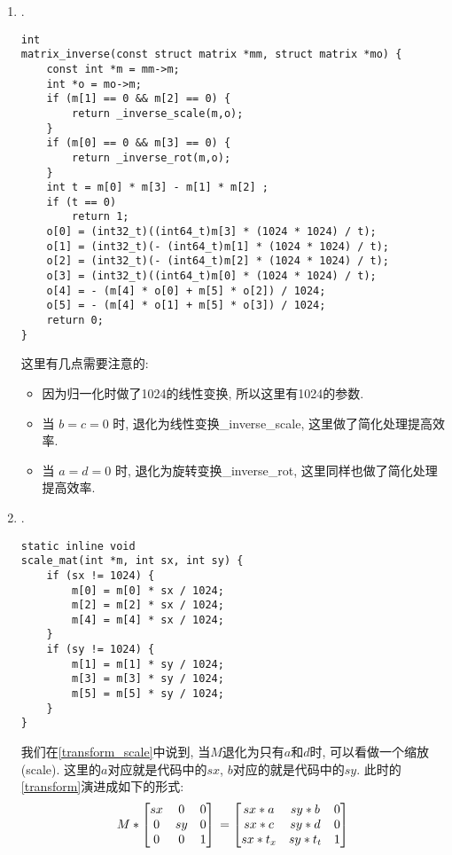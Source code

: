 {\begin {enumerate}
    \item { {}.
        \begin{lstlisting}[language={[ANSI]C}]
int
matrix_inverse(const struct matrix *mm, struct matrix *mo) {
    const int *m = mm->m;
    int *o = mo->m;
    if (m[1] == 0 && m[2] == 0) {
        return _inverse_scale(m,o);
    }
    if (m[0] == 0 && m[3] == 0) {
        return _inverse_rot(m,o);
    }
    int t = m[0] * m[3] - m[1] * m[2] ;
    if (t == 0)
        return 1;
    o[0] = (int32_t)((int64_t)m[3] * (1024 * 1024) / t);
    o[1] = (int32_t)(- (int64_t)m[1] * (1024 * 1024) / t);
    o[2] = (int32_t)(- (int64_t)m[2] * (1024 * 1024) / t);
    o[3] = (int32_t)((int64_t)m[0] * (1024 * 1024) / t);
    o[4] = - (m[4] * o[0] + m[5] * o[2]) / 1024;
    o[5] = - (m[4] * o[1] + m[5] * o[3]) / 1024;
    return 0;
}
        \end{lstlisting}
        这里有几点需要注意的:
        \begin{itemize}
        \item { 因为归一化时做了1024的线性变换, 所以这里有1024的参数.}
        \item { 当 $b = c = 0$ 时, 退化为线性变换\_inverse\_scale, 这里做了简化处理提高效率. }
        \item { 当 $a = d = 0$ 时, 退化为旋转变换\_inverse\_rot, 这里同样也做了简化处理提高效率. }
        \end{itemize}
    }

    \gaccobsplitinv

    \item { {}.
        \begin{lstlisting}[language={[ANSI]C}]
static inline void
scale_mat(int *m, int sx, int sy) {
    if (sx != 1024) {
        m[0] = m[0] * sx / 1024;
        m[2] = m[2] * sx / 1024;
        m[4] = m[4] * sx / 1024;
    }
    if (sy != 1024) {
        m[1] = m[1] * sy / 1024;
        m[3] = m[3] * sy / 1024;
        m[5] = m[5] * sy / 1024;
    }
}
        \end{lstlisting}
        我们在\eqref{transform_scale}中说到, 当$M$退化为只有$a$和$d$时, 可以看做一个缩放(scale). 这里的$a$对应就是代码中的$sx$, $b$对应的就是代码中的$sy$. 此时的\eqref{transform}演进成如下的形式:
        \begin{equation}
            M *
            \begin{bmatrix}
                sx  &   0   &   0\\
                0   &   sy  &   0\\
                0   &   0   &   1
            \end{bmatrix}\\
            =
            \begin{bmatrix}
                sx*a    &   sy*b    &   0\\
                sx*c    &   sy*d    &   0\\
                sx*t_x  &   sy*t_t  &   1
            \end{bmatrix}\\
        \end{equation}
    }


\end{enumerate}}

